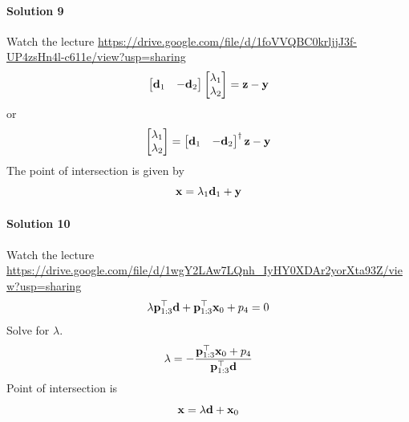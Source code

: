 \documentclass{article}
\begin{document}
\paragraph*{Solution 9}
Watch the lecture \url{https://drive.google.com/file/d/1foVVQBC0krljjJ3f-UP4zsHn4l-c611e/view?usp=sharing}
\[
  \begin{bmatrix}\mathbf{d}_1& -\mathbf{d}_2\end{bmatrix}\begin{bmatrix} \lambda_1 \\
    \lambda_2\end{bmatrix} = \mathbf{z} - \mathbf{y}
  \]
  or
  \[ \begin{bmatrix} \lambda_1 \\
      \lambda_2\end{bmatrix} = \begin{bmatrix}\mathbf{d}_1&
      -\mathbf{d}_2\end{bmatrix}^\dagger \mathbf{z} - \mathbf{y}
    \]
    The point of intersection is given by
    \[ \mathbf{x} = \lambda_1 \mathbf{d}_1 + \mathbf{y} \]
\paragraph*{Solution 10}

Watch the lecture \url{https://drive.google.com/file/d/1wgY2LAw7LQnh_IyHY0XDAr2yorXta93Z/view?usp=sharing}
\[
  \lambda \mathbf{p}_{1:3}^\top \mathbf{d} + \mathbf{p}_{1:3}^\top \mathbf{x}_0  + p_4 = 0
  \]
  Solve for $\lambda$.
  \[
    \lambda = -\frac{\mathbf{p}_{1:3}^\top \mathbf{x}_0  + p_4}{\mathbf{p}_{1:3}^\top \mathbf{d}}
    \]
    Point of intersection is
    \[
      \mathbf{x} = \lambda \mathbf{d} + \mathbf{x}_0
      \]
\end{document}
